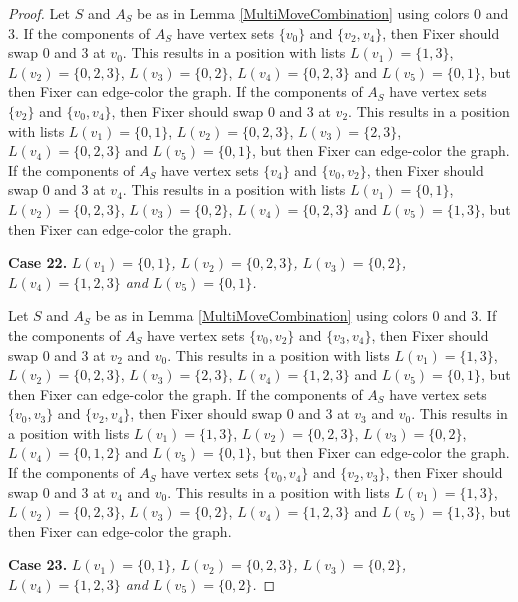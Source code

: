 \documentclass[12pt]{amsart}
\theoremstyle{plain}
\theoremstyle{definition}
\theoremstyle{remark}
\begin{document}
\begin{proof}
Let $S$ and $A_S$ be as in Lemma \ref{MultiMoveCombination} using colors $0$ and $3$. If the components of $A_S$ have vertex sets $\{v_0\}$ and $\{v_2, v_4\}$, then Fixer should swap 0 and 3 at $v_0$. This results in a position with lists $L(v_1) = \{1, 3\}$, $L(v_2) = \{0, 2, 3\}$, $L(v_3) = \{0, 2\}$, $L(v_4) = \{0, 2, 3\}$ and $L(v_5) = \{0, 1\}$, but then Fixer can edge-color the graph.
If the components of $A_S$ have vertex sets $\{v_2\}$ and $\{v_0, v_4\}$, then Fixer should swap 0 and 3 at $v_2$. This results in a position with lists $L(v_1) = \{0, 1\}$, $L(v_2) = \{0, 2, 3\}$, $L(v_3) = \{2, 3\}$, $L(v_4) = \{0, 2, 3\}$ and $L(v_5) = \{0, 1\}$, but then Fixer can edge-color the graph.
If the components of $A_S$ have vertex sets $\{v_4\}$ and $\{v_0, v_2\}$, then Fixer should swap 0 and 3 at $v_4$. This results in a position with lists $L(v_1) = \{0, 1\}$, $L(v_2) = \{0, 2, 3\}$, $L(v_3) = \{0, 2\}$, $L(v_4) = \{0, 2, 3\}$ and $L(v_5) = \{1, 3\}$, but then Fixer can edge-color the graph.

\noindent\textbf{Case 22.  }\textit{$L(v_1) = \{0, 1\}$, $L(v_2) = \{0, 2, 3\}$, $L(v_3) = \{0, 2\}$, $L(v_4) = \{1, 2, 3\}$ and $L(v_5) = \{0, 1\}$.}

Let $S$ and $A_S$ be as in Lemma \ref{MultiMoveCombination} using colors $0$ and $3$. If the components of $A_S$ have vertex sets $\{v_0, v_2\}$ and $\{v_3, v_4\}$, then Fixer should swap 0 and 3 at $v_2$ and $v_0$. This results in a position with lists $L(v_1) = \{1, 3\}$, $L(v_2) = \{0, 2, 3\}$, $L(v_3) = \{2, 3\}$, $L(v_4) = \{1, 2, 3\}$ and $L(v_5) = \{0, 1\}$, but then Fixer can edge-color the graph.
If the components of $A_S$ have vertex sets $\{v_0, v_3\}$ and $\{v_2, v_4\}$, then Fixer should swap 0 and 3 at $v_3$ and $v_0$. This results in a position with lists $L(v_1) = \{1, 3\}$, $L(v_2) = \{0, 2, 3\}$, $L(v_3) = \{0, 2\}$, $L(v_4) = \{0, 1, 2\}$ and $L(v_5) = \{0, 1\}$, but then Fixer can edge-color the graph.
If the components of $A_S$ have vertex sets $\{v_0, v_4\}$ and $\{v_2, v_3\}$, then Fixer should swap 0 and 3 at $v_4$ and $v_0$. This results in a position with lists $L(v_1) = \{1, 3\}$, $L(v_2) = \{0, 2, 3\}$, $L(v_3) = \{0, 2\}$, $L(v_4) = \{1, 2, 3\}$ and $L(v_5) = \{1, 3\}$, but then Fixer can edge-color the graph.

\noindent\textbf{Case 23.  }\textit{$L(v_1) = \{0, 1\}$, $L(v_2) = \{0, 2, 3\}$, $L(v_3) = \{0, 2\}$, $L(v_4) = \{1, 2, 3\}$ and $L(v_5) = \{0, 2\}$.}


\end{proof}
\end{document}
